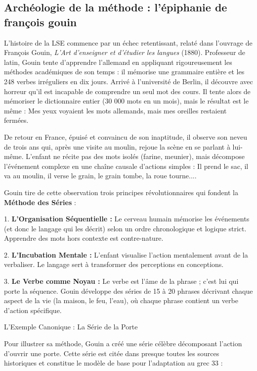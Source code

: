 \subsection{Archéologie de la méthode : l'épiphanie de françois gouin}

L'histoire de la LSE commence par un échec retentissant, relaté dans l'ouvrage de François Gouin,
\textit{L'Art d'enseigner et d'étudier les langues} (1880). Professeur de latin, Gouin tente
d'apprendre l'allemand en appliquant rigoureusement les méthodes académiques de son temps : il
mémorise une grammaire entière et les 248 verbes irréguliers en dix jours. Arrivé à l'université de
Berlin, il découvre avec horreur qu'il est incapable de comprendre un seul mot des cours. Il tente
alors de mémoriser le dictionnaire entier (30 000 mots en un mois), mais le résultat est le même :
\og Mes yeux voyaient les mots allemands, mais mes oreilles restaient
fermées\fg{}.\cite{III-2-2-ref30}

De retour en France, épuisé et convaincu de son inaptitude, il observe son neveu de trois ans qui,
après une visite au moulin, rejoue la scène en se parlant à lui-même. L'enfant ne récite pas des
mots isolés (\og farine\fg{}, \og meunier\fg{}), mais décompose l'événement complexe en une chaîne
causale d'actions simples : \og Il prend le sac, il va au moulin, il verse le grain, le grain tombe,
la roue tourne...\fg{}.\cite{III-2-2-ref33}

Gouin tire de cette observation trois principes révolutionnaires qui fondent la \textbf{Méthode des
Séries} :

1. \textbf{L'Organisation Séquentielle :} Le cerveau humain mémorise les événements (et donc le
langage qui les décrit) selon un ordre chronologique et logique strict. Apprendre des mots hors
contexte est contre-nature.

2. \textbf{L'Incubation Mentale :} L'enfant visualise l'action mentalement avant de la verbaliser.
Le langage sert à \og transformer des perceptions en conceptions\fg{}.

3. \textbf{Le Verbe comme Noyau :} Le verbe est l'âme de la phrase ; c'est lui qui porte la
séquence. Gouin développe des séries de 15 à 20 phrases décrivant chaque aspect de la vie (la
maison, le feu, l'eau), où chaque phrase contient un verbe d'action spécifique.\cite{III-2-2-ref35}

L'Exemple Canonique : La Série de la Porte

Pour illustrer sa méthode, Gouin a créé une série célèbre décomposant l'action d'ouvrir une porte.
Cette série est citée dans presque toutes les sources historiques et constitue le modèle de base
pour l'adaptation au grec 33 :

